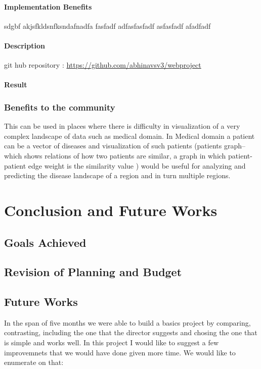 \subsubsection{Implementation Benefits}
sdgbf akjsfkldsnfksndafnadfa
fasfadf
adfasfasfadf
asfasfadf
afadfadf
\subsubsection{Description}
git hub repository  : \url{https://github.com/abhinavsv3/webproject}
\subsubsection{Result}
\subsection{Benefits to the community}
This can be used in places where there is difficulty in visualization of a very complex landscape
of data such as medical domain. In Medical domain a patient can be a vector of diseases and
visualization of such patients (patients graph–which shows relations of how two patients are
similar, a graph in which patient-patient edge weight is the similarity value ) would be useful for
analyzing and predicting the disease landscape of a region and in turn multiple regions.

\chapter{Conclusion and Future Works}
\section{Goals Achieved}
\section{Revision of Planning and Budget}
\section{Future Works}
In the span of five months we were able to build a basics project by comparing, contrasting, including the one that the director suggests and chosing the one that is simple and works well. In this project I would like to suggest a few improvemnets that we would have done given more time. We would like to enumerate on that:

